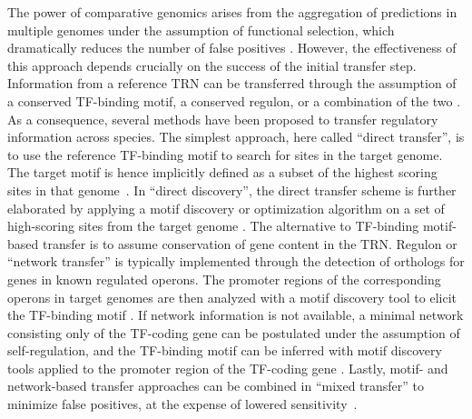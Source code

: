 The power of comparative genomics arises from the aggregation of predictions in
multiple genomes under the assumption of functional selection, which
dramatically reduces the number of false positives
\cite{gelfand2000comparative}. However, the effectiveness of this approach
depends crucially on the success of the initial transfer step. Information from
a reference TRN can be transferred through the assumption of a conserved
TF-binding motif, a conserved regulon, or a combination of the two
\cite{babu2008computational, baumbach2010power}. As a consequence, several
methods have been proposed to transfer regulatory information across
species. The simplest approach, here called “direct transfer”, is to use the
reference TF-binding motif to search for sites in the target genome. The target
motif is hence implicitly defined as a subset of the highest scoring sites in
that genome~\cite{tan2001comparative, makarova2001conservation,
  erill2004differences, rodionov2013transcriptional}. In “direct discovery”,
the direct transfer scheme is further elaborated by applying a motif discovery
or optimization algorithm on a set of high-scoring sites from the target genome
\cite{baumbach2009reliable, habib2012functional}. The alternative to TF-binding
motif-based transfer is to assume conservation of gene content in the
TRN\@. Regulon or “network transfer” is typically implemented through the
detection of orthologs for genes in known regulated operons. The promoter
regions of the corresponding operons in target genomes are then analyzed with a
motif discovery tool to elicit the TF-binding motif
\cite{mccue2001phylogenetic, wang2003combining, panina2003comparative,
  zhang2009genome}. If network information is not available, a minimal network
consisting only of the TF-coding gene can be postulated under the assumption of
self-regulation, and the TF-binding motif can be inferred with motif discovery
tools applied to the promoter region of the TF-coding gene
\cite{francke2008generic, cornish2012inference,
  ravcheev2014comparative}. Lastly, motif- and network-based transfer
approaches can be combined in “mixed transfer” to minimize false positives, at
the expense of lowered sensitivity~\cite{baumbach2010power,
  baumbach2009reliable, yu2004annotation}.

